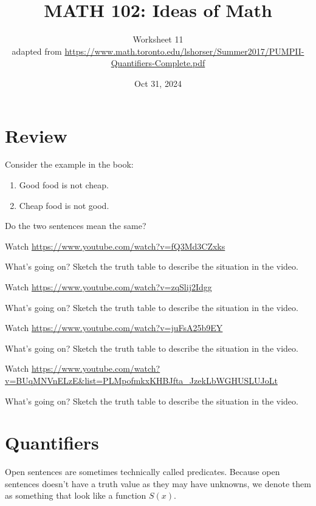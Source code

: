 \documentclass[12pt]{amsart}
\title{ MATH 102: Ideas  of Math }
\author{ Worksheet 11 \\ adapted from \url{https://www.math.toronto.edu/lshorser/Summer2017/PUMPII-Quantifiers-Complete.pdf} }
\date{Oct 31, 2024}
\begin{document}
\maketitle

\section{Review}
\begin{problem}
Consider the example in the book:

\begin{enumerate}
	\item Good food is not cheap.
	\item Cheap food is not good.
\end{enumerate}
Do the two sentences mean the same?
\end{problem}

\begin{problem}
Watch
\url{https://www.youtube.com/watch?v=fQ3Md3CZxks}

What's going on?
Sketch the truth table to describe the situation in the video.
\end{problem}


\begin{problem}
Watch
\url{https://www.youtube.com/watch?v=zqSlij2Idgg}

What's going on?
Sketch the truth table to describe the situation in the video.
\end{problem}


\begin{problem}
Watch
\url{https://www.youtube.com/watch?v=juFsA25b9EY}

What's going on?
Sketch the truth table to describe the situation in the video.
\end{problem}

\begin{problem}
Watch
\url{https://www.youtube.com/watch?v=BUqMNVnELzE&list=PLMpofmkxKHBJfta_JzekLbWGHUSLUJoLt}

What's going on?
Sketch the truth table to describe the situation in the video.
\end{problem}

\section{Quantifiers}

Open sentences are sometimes technically called predicates.
Because open sentences doesn't have a truth value as they may have unknowns, we denote them as something that look
like a function $S(x)$.
\end{document}

